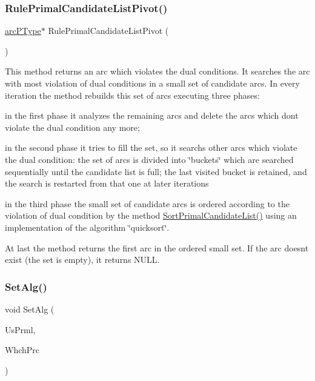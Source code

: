 \subsubsection{\texorpdfstring{Rule\+Primal\+Candidate\+List\+Pivot()}{RulePrimalCandidateListPivot()}}
{\footnotesize\ttfamily \mbox{\hyperlink{struct_m_c_f_simplex_1_1arc_p_type}{arc\+P\+Type}}$\ast$ Rule\+Primal\+Candidate\+List\+Pivot (\begin{DoxyParamCaption}\item[{void}]{ }\end{DoxyParamCaption})\hspace{0.3cm}{\ttfamily [private]}}

This method returns an arc which violates the dual conditions. It searches the arc with most violation of dual conditions in a small set of candidate arcs. In every iteration the method rebuilds this set of arcs executing three phases\+:


\begin{DoxyItemize}
\item in the first phase it analyzes the remaining arcs and delete the arcs which don\textquotesingle{}t violate the dual condition any more;
\item in the second phase it tries to fill the set, so it searchs other arcs which violate the dual condition\+: the set of arcs is divided into \char`\"{}buckets\char`\"{} which are searched sequentially until the candidate list is full; the last visited bucket is retained, and the search is restarted from that one at later iterations
\item in the third phase the small set of candidate arcs is ordered according to the violation of dual condition by the method \mbox{\hyperlink{class_m_c_f_simplex_a992f9de53818d841b969210dc1b892cd}{Sort\+Primal\+Candidate\+List()}} using an implementation of the algorithm \char`\"{}quicksort\char`\"{}.

At last the method returns the first arc in the ordered small set. If the arc doesn\textquotesingle{}t exist (the set is empty), it returns N\+U\+LL. 
\end{DoxyItemize}\mbox{\label{class_m_c_f_simplex_a1d66ff221305ac6731b32eaec7625a74}} 
\subsubsection{\texorpdfstring{Set\+Alg()}{SetAlg()}}
{\footnotesize\ttfamily void Set\+Alg (\begin{DoxyParamCaption}\item[{bool}]{Us\+Prml,  }\item[{char}]{Whch\+Prc }\end{DoxyParamCaption})}

